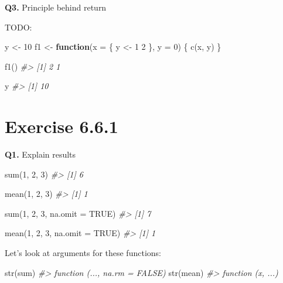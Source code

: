 \documentclass[
]{book}
\newenvironment{Shaded}{\begin{snugshade}}{\end{snugshade}}
\newcommand{\AttributeTok}[1]{\textcolor[rgb]{0.77,0.63,0.00}{#1}}
\newcommand{\CommentTok}[1]{\textcolor[rgb]{0.56,0.35,0.01}{\textit{#1}}}
\newcommand{\ConstantTok}[1]{\textcolor[rgb]{0.00,0.00,0.00}{#1}}
\newcommand{\ControlFlowTok}[1]{\textcolor[rgb]{0.13,0.29,0.53}{\textbf{#1}}}
\newcommand{\DecValTok}[1]{\textcolor[rgb]{0.00,0.00,0.81}{#1}}
\newcommand{\FunctionTok}[1]{\textcolor[rgb]{0.00,0.00,0.00}{#1}}
\newcommand{\NormalTok}[1]{#1}
\newcommand{\OtherTok}[1]{\textcolor[rgb]{0.56,0.35,0.01}{#1}}
\begin{document}
\textbf{Q3.} Principle behind return

TODO:

\begin{Shaded}
\begin{Highlighting}[]
\NormalTok{y }\OtherTok{\textless{}{-}} \DecValTok{10}
\NormalTok{f1 }\OtherTok{\textless{}{-}} \ControlFlowTok{function}\NormalTok{(}\AttributeTok{x =}
\NormalTok{                 \{}
\NormalTok{                   y }\OtherTok{\textless{}{-}} \DecValTok{1}
                   \DecValTok{2}
\NormalTok{                 \},}
               \AttributeTok{y =} \DecValTok{0}\NormalTok{)}
\NormalTok{\{}
  \FunctionTok{c}\NormalTok{(x, y)}
\NormalTok{\}}

\FunctionTok{f1}\NormalTok{()}
\CommentTok{\#\textgreater{} [1] 2 1}

\NormalTok{y}
\CommentTok{\#\textgreater{} [1] 10}
\end{Highlighting}
\end{Shaded}

\hypertarget{exercise-6.6.1}{%
\section{Exercise 6.6.1}\label{exercise-6.6.1}}

\textbf{Q1.} Explain results

\begin{Shaded}
\begin{Highlighting}[]
\FunctionTok{sum}\NormalTok{(}\DecValTok{1}\NormalTok{, }\DecValTok{2}\NormalTok{, }\DecValTok{3}\NormalTok{)}
\CommentTok{\#\textgreater{} [1] 6}

\FunctionTok{mean}\NormalTok{(}\DecValTok{1}\NormalTok{, }\DecValTok{2}\NormalTok{, }\DecValTok{3}\NormalTok{)}
\CommentTok{\#\textgreater{} [1] 1}

\FunctionTok{sum}\NormalTok{(}\DecValTok{1}\NormalTok{, }\DecValTok{2}\NormalTok{, }\DecValTok{3}\NormalTok{, }\AttributeTok{na.omit =} \ConstantTok{TRUE}\NormalTok{)}
\CommentTok{\#\textgreater{} [1] 7}

\FunctionTok{mean}\NormalTok{(}\DecValTok{1}\NormalTok{, }\DecValTok{2}\NormalTok{, }\DecValTok{3}\NormalTok{, }\AttributeTok{na.omit =} \ConstantTok{TRUE}\NormalTok{)}
\CommentTok{\#\textgreater{} [1] 1}
\end{Highlighting}
\end{Shaded}

Let's look at arguments for these functions:

\begin{Shaded}
\begin{Highlighting}[]
\FunctionTok{str}\NormalTok{(sum)}
\CommentTok{\#\textgreater{} function (..., na.rm = FALSE)}
\FunctionTok{str}\NormalTok{(mean)}
\CommentTok{\#\textgreater{} function (x, ...)}
\end{Highlighting}
\end{Shaded}
\end{document}
